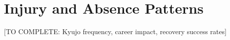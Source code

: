 \section{Injury and Absence Patterns}

[TO COMPLETE: Kyujo frequency, career impact, recovery success rates]